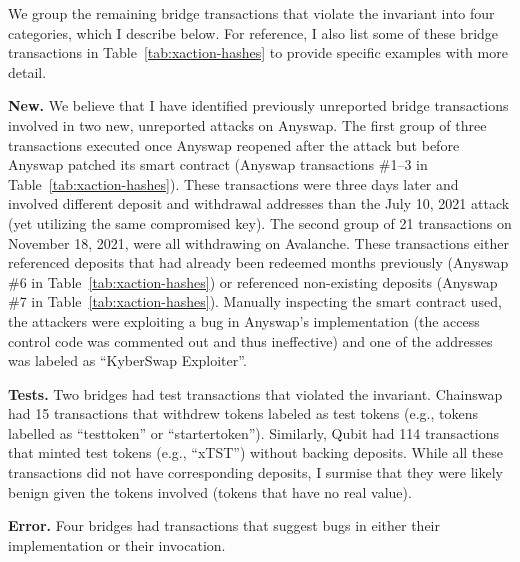 We group the remaining bridge transactions that violate the invariant
into four categories, which I describe below.  For reference, I also
list some of these bridge transactions in
Table~\ref{tab:xaction-hashes} to provide specific
examples with more detail.



\newcommand{\pgraph}[1]{\vspace*{0.1in}\noindent\textbf{#1}}

\pgraph{New.}  We believe that I have identified
previously unreported bridge transactions involved in two new,
unreported attacks on Anyswap.
The first group of three transactions executed once Anyswap reopened
after the attack but before Anyswap patched its smart contract
(Anyswap transactions \#1--3 in Table~\ref{tab:xaction-hashes}).  These transactions were three days later and involved
different deposit and withdrawal addresses than the July 10, 2021
attack (yet utilizing the same compromised key).  The second group of 21 transactions on November 18, 2021,
were all withdrawing on Avalanche.  These
transactions either referenced deposits that had already been redeemed
months previously (Anyswap \#6 in Table~\ref{tab:xaction-hashes}) or referenced non-existing deposits (Anyswap \#7 in Table~\ref{tab:xaction-hashes}).  Manually
inspecting the smart contract used, the attackers were exploiting a
bug in Anyswap's implementation (the access control code was commented
out and thus ineffective) and one of the addresses was labeled as ``KyberSwap Exploiter''. 


\pgraph{Tests.}  Two bridges had test transactions that violated the
invariant.
%
Chainswap had 15 transactions that withdrew tokens labeled as test
tokens (e.g., tokens labelled as ``testtoken'' or ``startertoken''). Similarly, Qubit had 114 transactions that minted test tokens (e.g., ``xTST'') without backing deposits.
While all these transactions did not have corresponding deposits, I surmise that they were likely benign given the tokens involved (tokens that have no real value).




\pgraph{Error.} Four bridges had transactions that suggest bugs in
either their implementation or their invocation.

